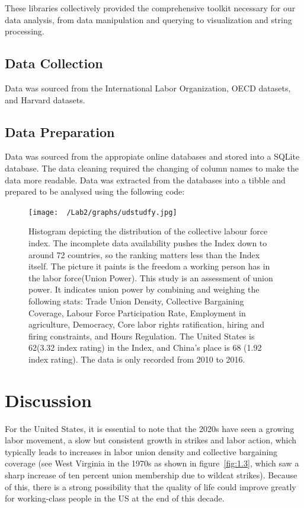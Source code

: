 \documentclass[11pt]{article}\usepackage[]{graphicx}\usepackage[]{xcolor}
\begin{document}
These libraries collectively provided the comprehensive toolkit necessary for our data analysis, from data manipulation and querying to visualization and string processing.

\subsection{Data Collection}
Data was sourced from the International Labor Organization, OECD datasets, and Harvard datasets.

\subsection{Data Preparation}
Data was sourced from the appropiate online databases and stored into a SQLite database. The data cleaning required the changing of column names to make the data more readable. Data was extracted from the databases into a tibble and prepared to be analysed using the following code: 






\begin{figure}[h]
\centering
  \begin{minipage}{0.7\linewidth}
  \texttt{[image: ~/Lab2/graphs/udstudfy.jpg]}
  \caption{Histogram depicting the distribution of the collective labour force index. The incomplete data availability pushes the Index down to around 72 countries, so the ranking matters less than the Index itself. The picture it paints is the freedom a working person has in the labor force(Union Power). This study is an assessment of union power. It indicates union power by combining and weighing the following stats: Trade Union Density, Collective Bargaining Coverage, Labour Force Participation Rate, Employment in agriculture, Democracy, Core labor rights ratification, hiring and firing constraints, and Hours Regulation. The United States is 62(3.32 index rating) in the Index, and China's place is 68 (1.92 index rating). The data is only recorded from 2010 to 2016. }
  \label{fig:1.0}
  \end{minipage}
\end{figure}


\clearpage
\section{Discussion}
For the United States, it is essential to note that the 2020s have seen a growing labor movement, a slow but consistent growth in strikes and labor action, which typically leads to increases in labor union density and collective bargaining coverage (see West Virginia in the 1970s as shown in figure~\ref{fig:1.3}, which saw a sharp increase of ten percent union membership due to wildcat strikes). Because of this, there is a strong possibility that the quality of life could improve greatly for working-class people in the US at the end of this decade. 
\end{document}
